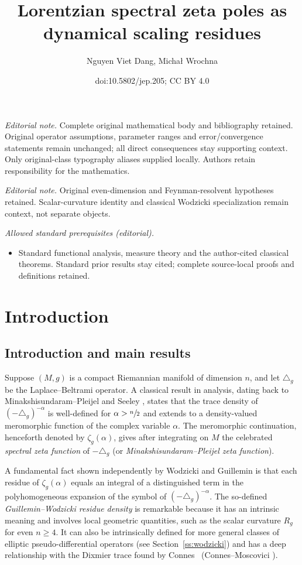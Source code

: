 \documentclass[10pt]{amsart}
\title{Lorentzian spectral zeta poles as dynamical scaling residues}
\author{Nguyen Viet Dang, Michał Wrochna}
\date{doi:10.5802/jep.205; CC BY 4.0}
\theoremstyle{definition}
\let\cv\alpha
\let\Re\relax
\DeclareMathOperator{\Re}{Re}
\renewcommand{\sec}[1]{Section~\ref{#1}}
\def\sn2{\sfrac{n}{2}}
\providecommand{\mainmatter}{}\providecommand{\backmatter}{}
\begin{document}
\maketitle
\noindent\textit{Editorial note.} Complete original mathematical body and bibliography retained. Original operator assumptions, parameter ranges and error/convergence statements remain unchanged; all direct consequences stay supporting context. Only original-class typography aliases supplied locally. Authors retain responsibility for the mathematics.\par\medskip
\noindent\textit{Editorial note.} Original even-dimension and Feynman-resolvent hypotheses retained. Scalar-curvature identity and classical Wodzicki specialization remain context, not separate objects.\par\medskip
\noindent\textit{Allowed standard prerequisites (editorial).}\begin{itemize}
\item Standard functional analysis, measure theory and the author-cited classical theorems. Standard prior results stay cited; complete source-local proofs and definitions retained.
\end{itemize}\medskip
\tableofcontents
\mainmatter

\section{Introduction}

\subsection{Introduction and main results} Suppose $(M,g)$ is a compact Riemannian manifold of dimension $n$, and let $\triangle_g$ be the Laplace--Beltrami operator. A classical result in analysis, dating back to Minakshisundaram--Pleijel \cite{Minakshisundaram1949} and Seeley \cite{seeley}, states that the trace density of $(-\triangle_g)^{-\cv}$ is well-defined for $\Re \cv > \sn2$ and extends to a density-valued meromorphic function of the complex variable $\cv$. The meromorphic continuation, henceforth denoted by $\zeta_g(\cv)$, gives after integrating on $M$ the celebrated \emph{spectral zeta function} of $-\triangle_g$ (or \emph{Minakshisundaram--Pleijel zeta function}).

A fundamental fact shown independently by Wodzicki \cite{wodzicki} and Guillemin \cite{Guillemin1985} is that each residue of $\zeta_g(\cv)$ equals an integral of a distinguished term in the polyhomogeneous expansion of the symbol of $(-\triangle_g)^{-\cv}$. The so-defined \emph{Guillemin--Wodzicki residue density} is remarkable because it has an {intrinsic} meaning and involves local geometric quantities, such as the scalar curvature $R_g$ for even $n\geqslant 4$. It can also be intrinsically defined for more general classes of elliptic pseudo-differential operators (see \sec{ss:wodzicki}) and has a deep relationship with the Dixmier trace found by Connes~\cite{Connes1988} (\cf Connes--Moscovici \cite{Connes1995}).
\end{document}
